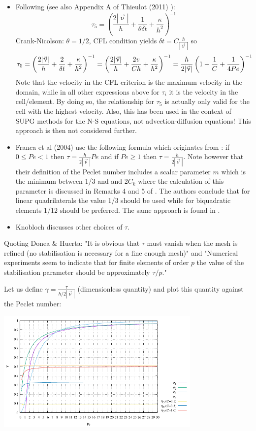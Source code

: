 \begin{itemize}
\item Following \cite{teos00} (see also Appendix A of Thieulot (2011) \cite{thie11}):
\[
\tau_5 = \left( \frac{2 |\vec{\upnu}|}{h} + \frac{1}{\theta \delta t} + \frac{\kappa}{h^2} \right)^{-1}  
\]
Crank-Nicolson: $\theta=1/2$, CFL condition yields $\delta t = C \frac{h}{|\vec\upnu|}$ so 
\[
\tau_5 = \left( \frac{2 |\vec{\upnu}|}{h} + \frac{2}{\delta t}+  \frac{\kappa}{h^2}  \right)^{-1}  
= \left( \frac{2 |\vec{\upnu}|}{h} + \frac{2 v}{C h} +  \frac{\kappa}{h^2}  \right)^{-1}  
= \frac{h}{2 |\vec{\upnu}|}  \left( 1 + \frac{1}{C} + \frac{1}{4 Pe} \right)^{-1} \nonumber 
\]
Note that the velocity in the CFL criterion is the maximum velocity in the domain, while 
in all other expressions above for $\tau_i$ it is the velocity in the cell/element. 
By doing so, the relationship  for $\tau_5$ is actually only valid for the cell with the 
highest velocity. 
Also, this has been used in the context of SUPG methods for the N-S equations, not advection-diffusion
equations! This approach is then not considered further.

\item Franca et al (2004) \cite{frhm04} use the following formula which originates from \cite{frfh92}:
if $0\le Pe < 1$ then
$\tau = \frac{h}{2 |\vec\upnu|} Pe$ and if $Pe \ge 1$ then $\tau = \frac{h}{2 |\vec\upnu|}$.
Note however that their definition of the Peclet number includes a scalar parameter $m$ which is 
the minimum between 1/3 and and 2$C_k$ where the calculation of this parameter is discussed in 
Remarks 4 and 5 of \cite{frfh92}. The authors conclude that for linear quadrilaterals the value
1/3 should be used while for biquadratic elements 1/12 should be preferred.
The same approach is found in \cite{brbh92}. 

\item Knobloch \cite{knob08} discusses other choices of $\tau$.

\end{itemize}

Quoting Donea \& Huerta: "It is obvious that $\tau$ must vanish when the mesh is refined (no stabilisation
is necessary for a fine enough mesh)" and "Numerical experiments seem to indicate that for 
finite elements of order $p$ the value of the stabilisation parameter should be approximately 
$\tau/p$."

Let us define $\gamma=\frac{\tau}{h/2|\vec\upnu|}$ (dimensionless quantity) and 
plot this quantity against the Peclet number:

\begin{center}
\includegraphics[width=10cm]{images/supg/gamma} 
\end{center}

